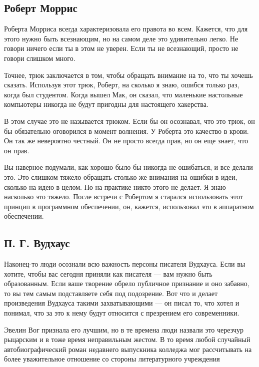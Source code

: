 \documentclass[ebook,12pt,oneside,openany]{memoir}
\begin{document}
\subsection{Роберт Моррис}

Роберта Морриса всегда характеризовала его правота во всем. Кажется,
что для этого нужно быть всезнающим, но на самом деле это удивительно
легко. Не говори ничего если ты в этом не уверен. Если ты не
всезнающий, просто не говори слишком много. \newline

Точнее, трюк заключается в том, чтобы обращать внимание на то, что ты
хочешь сказать. Используя этот трюк, Роберт, на сколько я знаю, ошибся
только раз, когда был студентом. Когда вышел Мак, он сказал, что
маленькие настольные компьютеры никогда не будут пригодны для
настоящего хакерства. \newline

В этом случае это не называется трюком. Если бы он осознавал, что это
трюк, он бы обязательно оговорился в момент волнения. У Роберта это
качество в крови. Он так же невероятно честный. Он не просто всегда
прав, но он еще знает, что он прав. \newline

Вы наверное подумали, как хорошо было бы никогда не ошибаться, и все
делали это. Это слишком тяжело обращать столько же внимания на ошибки
в идеи, сколько на идею в целом. Но на практике никто этого не делает.
Я знаю насколько это тяжело. После встречи с Робертом я старался
использовать этот принцип в программном обеспечении, он, кажется,
использовал это в аппаратном обеспечении. \newline

\subsection{П. Г. Вудхаус}

Наконец-то люди осознали всю важность персоны писателя Вудхауса. Если
вы хотите, чтобы вас сегодня приняли как писателя — вам нужно быть
образованным. Если ваше творение обрело публичное признание и оно
забавно, то вы тем самым подставляете себя под подозрение. Вот что и
делает произведения Вудхауса такими захватывающими — он писал то, что
хотел и понимал, что за это к нему будут относится с презрением его
современники. \newline

Эвелин Вог признала его лучшим, но в те времена люди назвали это
черезчур рыцарским и в тоже время неправильным жестом. В то время
любой случайный автобиографический роман недавнего выпускника колледжа
мог рассчитывать на более уважительное отношение со стороны
литературного учреждения \newline
\end{document}
